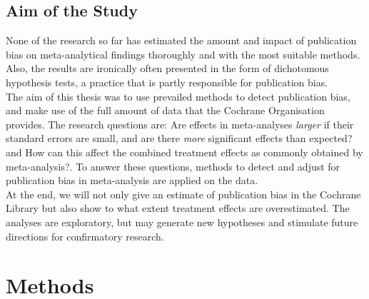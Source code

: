 \documentclass[11pt,a4paper,twoside]{book}\usepackage[]{graphicx}\usepackage[]{color}
\begin{document}
\section{Aim of the Study}
None of the research so far has estimated the amount and impact of publication bias on meta-analytical findings thoroughly and with the most suitable methods. Also, the results are ironically often presented in the form of dichotomous hypothesis tests, a practice that is partly responsible for publication bias.\\
The aim of this thesis was to use prevailed methods to detect publication bias, and make use of the full amount of data that the Cochrane Organisation provides. The research questions are: Are effects in meta-analyses \textit{larger} if their standard errors are small, and are there \textit{more} significant effects than expected? and How can this affect the combined treatment effects as commonly obtained by meta-analysis?. To answer these questions, methods to detect and adjust for publication bias in meta-analysis are applied on the data.\\
At the end, we will not only give an estimate of publication bias in the Cochrane Library but also show to what extent treatment effects are overestimated. The analyses are exploratory, but may generate new hypotheses and stimulate future directions for confirmatory research.








\chapter{Methods} \label{ch:methods}
\end{document}
